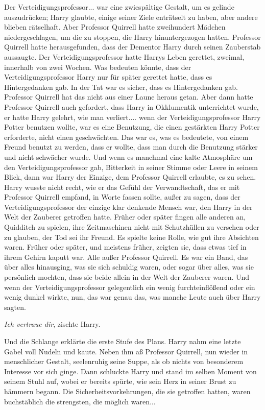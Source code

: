 Der Verteidigungsprofessor... war eine zwiespältige Gestalt, um es gelinde
auszudrücken; Harry glaubte, einige seiner Ziele enträtselt zu haben, aber
andere blieben rätselhaft. Aber Professor Quirrell hatte zweihundert Mädchen
niedergeschlagen, um die zu stoppen, die Harry hinuntergezogen hatten. Professor
Quirrell hatte herausgefunden, dass der Dementor Harry durch seinen Zauberstab
aussaugte. Der Verteidigungsprofessor hatte Harrys Leben gerettet, zweimal,
innerhalb von zwei Wochen. Was bedeuten könnte, dass der Verteidigungsprofessor
Harry nur für später gerettet hatte, dass es Hintergedanken gab. In der Tat war
es sicher, dass es Hintergedanken gab. Professor Quirrell hat das nicht aus
einer Laune heraus getan. Aber dann hatte Professor Quirrell auch gefordert,
dass Harry in Okklumentik unterrichtet wurde, er hatte Harry gelehrt, wie man
verliert.... wenn der Verteidigungsprofessor Harry Potter benutzen wollte, war
es eine Benutzung, die einen gestärkten Harry Potter erforderte, nicht einen
geschwächten. Das war es, was es bedeutete, von einem Freund benutzt zu werden,
dass er wollte, dass man durch die Benutzung stärker und nicht schwächer wurde.
Und wenn es manchmal eine kalte Atmosphäre um den Verteidigungsprofessor gab,
Bitterkeit in seiner Stimme oder Leere in seinem Blick, dann war Harry der
Einzige, dem Professor Quirrell erlaubte, es zu sehen. Harry wusste nicht recht,
wie er das Gefühl der Verwandtschaft, das er mit Professor Quirrell empfand, in
Worte fassen sollte, außer zu sagen, dass der Verteidigungsprofessor der einzige
klar denkende Mensch war, den Harry in der Welt der Zauberer getroffen hatte.
Früher oder später fingen alle anderen an, Quidditch zu spielen, ihre
Zeitmaschinen nicht mit Schutzhüllen zu versehen oder zu glauben, der Tod sei
ihr Freund. Es spielte keine Rolle, wie gut ihre Absichten waren. Früher oder
später, und meistens früher, zeigten sie, dass etwas tief in ihrem Gehirn kaputt
war. Alle außer Professor Quirrell. Es war ein Band, das über alles hinausging,
was sie sich schuldig waren, oder sogar über alles, was sie persönlich mochten,
dass sie beide allein in der Welt der Zauberer waren. Und wenn der
Verteidigungsprofessor gelegentlich ein wenig furchteinflößend oder ein wenig
dunkel wirkte, nun, das war genau das, was manche Leute auch über Harry sagten.

\glqq{}\emph{Ich vertraue dir}\grqq{}, zischte Harry.

Und die Schlange erklärte die erste Stufe des Plans. Harry nahm eine letzte
Gabel voll Nudeln und kaute. Neben ihm aß Professor Quirrell, nun wieder in
menschlicher Gestalt, seelenruhig seine Suppe, als ob nichts von besonderem
Interesse vor sich ginge. Dann schluckte Harry und stand im selben Moment von
seinem Stuhl auf, wobei er bereits spürte, wie sein Herz in seiner Brust zu
hämmern begann. Die Sicherheitsvorkehrungen, die sie getroffen hatten, waren
buchstäblich die strengsten, die möglich waren...

